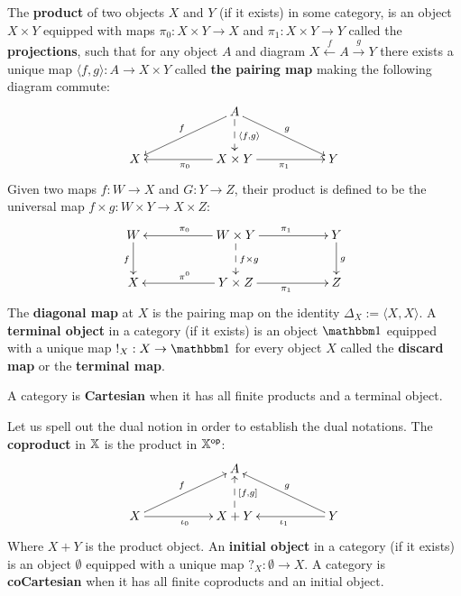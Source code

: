\begin{definition}
The {\bf product} of two objects $X$ and $Y$ (if it exists) in some category, is an object $X\times Y$ equipped with maps $\pi_0:X\times Y\to X $ and $\pi_1:X\times Y \to Y$ called the {\bf projections},  such that for any object $A$ and diagram  $X \xleftarrow{f} A \xrightarrow{g} Y$ there exists a unique map $\langle  f, g \rangle :A \to X\times Y$ called {\bf the pairing map} making the following diagram commute:
$$
\xymatrix{
    &
    & A \ar[lld]_f \ar[rrd]^g \ar@{-->}[d]^{\langle f,g\rangle}
    &
    &
  \\X 
    &
    & X\times Y \ar[ll]^{\pi_0} \ar[rr]_{\pi_1}
    &
    & Y
}
$$ 
Given two maps $f:W\to X$ and $G:Y\to Z$, their product is defined to be the universal map $f\times g:W\times Y \to X\times Z$: 
$$
\xymatrix{
    W \ar[d]_f
    &
    & W\times Y \ar@{-->}[d]^{f\times g} \ar[ll]_{\pi_0} \ar[rr]^{\pi_1}
    &
    & Y \ar[d]^g
  \\X
    &
    & Y\times Z  \ar[ll]_{\pi^0} \ar[rr]_{\pi_1}
    &
    &Z
}
$$
The {\bf diagonal map} at $X$ is the pairing map on the identity $\Delta_X:=\langle X,X\rangle$.  A {\bf terminal object} in a category (if it exists) is an object $\one$ equipped with a unique map $!_X:X\to \one$ for every object $X$ called the {\bf discard map} or the {\bf terminal map}.



A category is  {\bf Cartesian} when it has all finite products and a terminal object. %





Let us spell out the dual notion in order to establish the dual notations.
The {\bf coproduct} in $\mathbb{X}$ is the product in $\mathbb{X}^{\mathsf{op}}$:
$$
\xymatrix{
    &
    & A
    &
    &
  \\X \ar[urr]^{f} \ar[rr]_{\iota_0}
    &
    & X+  Y \ar@{-->}[u]_{[f,g]} 
    &
    & Y\ar[ull]_{g}  \ar[ll]^{\iota_1}
}
$$ 
Where $ X+  Y $ is the product object.%
An {\bf initial object} in a category (if it exists) is an object $\emptyset$ equipped with a unique map $?_X: \emptyset\to  X$. %
A category is  {\bf coCartesian} when it has all finite coproducts and an initial object.%
\end{definition}
